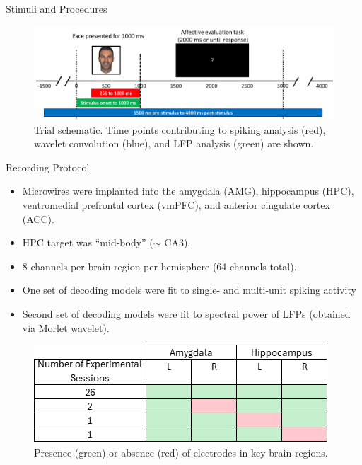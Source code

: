\documentclass[final,20pt]{beamer}
\newlength{\colwidth}
\newlength{\colwidthsmall}
\begin{document}
\begin{frame}[t]
\begin{columns}[t]
\begin{column}{\colwidthsmall}
\begin{block}{Stimuli and Procedures}
    \begin{figure}
        \includegraphics[width=1\textwidth]{figures/trial.png}
        \caption{Trial schematic. Time points contributing to spiking analysis (red), wavelet convolution (blue), and LFP analysis (green) are shown.
        }
    \end{figure}
            
  \end{block}

    \begin{block}{Recording Protocol}
  
   \begin{itemize}
        \item Microwires were implanted into the amygdala (AMG), hippocampus (HPC), ventromedial prefrontal cortex (vmPFC), and anterior cingulate cortex (ACC).
        \item HPC target was ``mid-body'' ($\sim$ CA3).
        \item 8 channels per brain region per hemisphere (64 channels total). 
        \item One set of decoding models were fit to single- and multi-unit spiking activity
        \item Second set of decoding models were fit to spectral power of LFPs (obtained via Morlet wavelet). 
   \end{itemize}
   
    \begin{figure}
        \includegraphics[width=.9\textwidth]{figures/recording sites.png}
        \caption{Presence (green) or absence (red) of electrodes in key brain regions.}
    \end{figure}
  \end{block}


\end{column}
\end{columns}
\end{frame}
\end{document}
